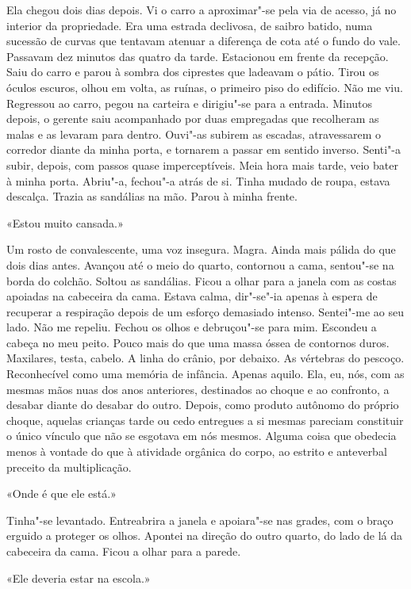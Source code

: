 Ela chegou dois dias depois. Vi o carro a aproximar"-se pela via de
acesso, já no interior da propriedade. Era uma estrada declivosa, de
saibro batido, numa sucessão de curvas que tentavam atenuar a diferença
de cota até o fundo do vale. Passavam dez minutos das quatro da tarde.
Estacionou em frente da recepção. Saiu do carro e parou à sombra dos
ciprestes que ladeavam o pátio. Tirou os óculos escuros, olhou em volta,
as ruínas, o primeiro piso do edifício. Não me viu. Regressou ao carro,
pegou na carteira e dirigiu"-se para a entrada. Minutos depois, o
gerente saiu acompanhado por duas empregadas que recolheram as malas e
as levaram para dentro. Ouvi"-as subirem as escadas, atravessarem o
corredor diante da minha porta, e tornarem a passar em sentido inverso.
Senti"-a subir, depois, com passos quase imperceptíveis. Meia hora mais
tarde, veio bater à minha porta. Abriu"-a, fechou"-a atrás de si. Tinha
mudado de roupa, estava descalça. Trazia as sandálias na mão. Parou à
minha frente.

«Estou muito cansada.»

Um rosto de convalescente, uma voz insegura. Magra. Ainda mais pálida do
que dois dias antes. Avançou até o meio do quarto, contornou a cama,
sentou"-se na borda do colchão. Soltou as sandálias. Ficou a olhar para
a janela com as costas apoiadas na cabeceira da cama. Estava calma,
dir"-se"-ia apenas à espera de recuperar a respiração depois de um
esforço demasiado intenso. Sentei"-me ao seu lado. Não me repeliu.
Fechou os olhos e debruçou"-se para mim. Escondeu a cabeça no meu peito.
Pouco mais do que uma massa óssea de contornos duros. Maxilares, testa,
cabelo. A linha do crânio, por debaixo. As vértebras do pescoço.
Reconhecível como uma memória de infância. Apenas aquilo. Ela, eu, nós,
com as mesmas mãos nuas dos anos anteriores, destinados ao choque e ao
confronto, a desabar diante do desabar do outro. Depois, como produto
autônomo do próprio choque, aquelas crianças tarde ou cedo entregues a
si mesmas pareciam constituir o único vínculo que não se esgotava em nós
mesmos. Alguma coisa que obedecia menos à vontade do que à atividade
orgânica do corpo, ao estrito e anteverbal preceito da multiplicação.

«Onde é que ele está.»

Tinha"-se levantado. Entreabrira a janela e apoiara"-se nas grades, com
o braço erguido a proteger os olhos. Apontei na direção do outro
quarto, do lado de lá da cabeceira da cama. Ficou a olhar para a parede.

«Ele deveria estar na escola.»


